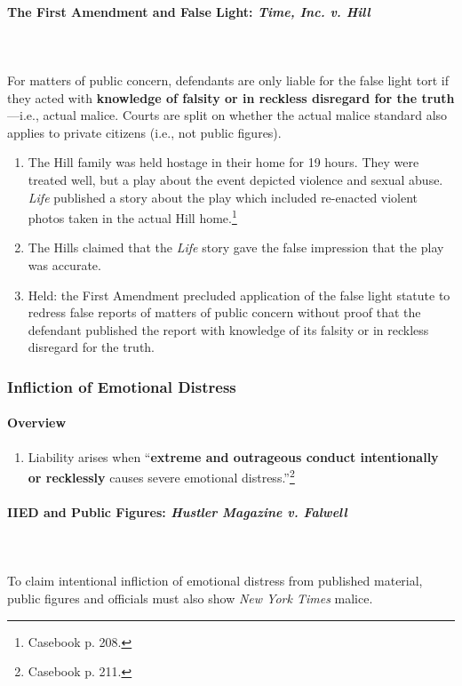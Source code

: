 \paragraph{The First Amendment and False Light: \emph{Time, Inc. v. Hill}}
~\\\\
For matters of public concern, defendants are only liable for the false light 
tort if they acted with \textbf{knowledge of falsity or in reckless disregard 
for the truth}---i.e., actual malice. Courts are split on whether the actual 
malice standard also applies to private citizens (i.e., not public figures).

\begin{enumerate}
    \item The Hill family was held hostage in their home for 19 hours. They were 
    treated well, but a play about the event depicted violence and sexual abuse. 
    \emph{Life} published a story about the play which included re-enacted 
    violent photos taken in the actual Hill home.\footnote{Casebook p. 208.}
    \item The Hills claimed that the \emph{Life} story gave the false impression 
    that the play was accurate.
    \item Held: the First Amendment precluded application of the false light 
    statute to redress false reports of matters of public concern without proof 
    that the defendant published the report with knowledge of its falsity or in
    reckless disregard for the truth.
\end{enumerate}

\subsubsection{Infliction of Emotional Distress}

\paragraph{Overview}

\begin{enumerate}
    \item Liability arises when ``\textbf{extreme and outrageous conduct 
    intentionally or recklessly} causes severe emotional 
    distress.''\footnote{Casebook p. 211.}
\end{enumerate}

\paragraph{IIED and Public Figures: \emph{Hustler Magazine v. Falwell}}
~\\\\
To claim intentional infliction of emotional distress from published material, 
public figures and officials must also show \emph{New York Times} malice.

